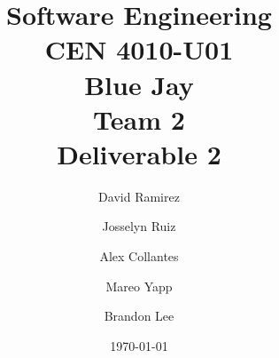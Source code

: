 \documentclass{report}
\begin{document}
\title{Software Engineering\\CEN 4010-U01\\Blue Jay\\Team 2\\Deliverable 2}
\author{David Ramirez\and Josselyn Ruiz\and Alex Collantes\and Mareo Yapp\and Brandon Lee}
\date{\today}
\maketitle

\begin{abstract}

\end{abstract}
\end{document}
